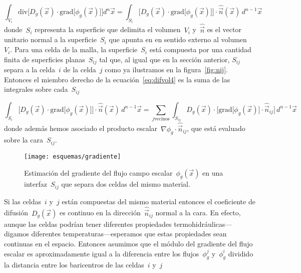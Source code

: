\begin{equation}\label{eq:difvol4}
 \int_{V_i} \text{div} {\Big[ D_g(\vec{x}) \cdot \text{grad} {\big[\phi_g(\vec{x})\big]} \Big]} d^n\vec{x} =
\int_{S_i} \Big[ D_g(\vec{x}) \cdot \text{grad} {\big[\phi_g(\vec{x})\big]} \Big] \cdot \hat{\vec{n}}(\vec{x}) \, d^{n-1} \vec{x}
\end{equation}
%
donde~$S_i$ representa la superficie que delimita el volumen~$V_i$ y~$\hat{\vec{n}}$ es el vector unitario normal a la superficie~$S_i$ que apunta en en sentido externo al volumen~$V_i$. Para una celda de la malla, la superficie~$S_i$ está compuesta por una cantidad finita de superficies planas~$S_{ij}$ tal que, al igual que en la sección anterior, $S_{ij}$ separa a la celda~$i$ de la celda~$j$ como ya ilustramos en la figura~\ref{fig:nij}. Entonces el miembro derecho de la ecuación~\eqref{eq:difvol4} es la suma de las integrales sobre cada~$S_{ij}$

\begin{equation*}
\int_{S_i} \Big[ D_g(\vec{x}) \cdot \text{grad} {\big[\phi_g(\vec{x})\big]} \Big] \cdot \hat{\vec{n}}(\vec{x}) \, d^{n-1} \vec{x} =
\sum_{j \text{vecinos}}
\int_{S_{ij}} D_g(\vec{x}) \cdot \Big[ \text{grad} {\big[\phi_g(\vec{x})\big]}  \cdot \hat{\vec{n}}_{ij} \Big] \, d^{n-1} \vec{x}
\end{equation*}
%
donde además hemos asociado el producto escalar~$\nabla \phi_g \cdot \hat{\vec{n}}_{ij}$, que está evaluado sobre la cara~$S_{ij}$.


\begin{figure}
 \begin{center}
  \texttt{[image: esquemas/gradiente]}
 \end{center}
\caption{\label{fig:gradiente}Estimación del gradiente del flujo campo escalar~$\phi_g(\vec{x})$ en una interfaz~$S_{ij}$ que separa dos celdas del mismo material.}
\end{figure}


\medskip

Si las celdas~$i$ y~$j$ están compuestas del mismo material entonces el coeficiente de difusión~$D_g(\vec{x})$ es continuo en la dirección~$\hat{\vec{n}}_{ij}$ normal a la cara. En efecto, aunque las celdas podrían tener diferentes propiedades termohidráulicas---digamos diferentes tem\-pe\-ra\-tu\-ras---esperamos que estas propiedades sean continuas en el espacio. Entonces asumimos que el módulo del gradiente del flujo escalar es aproximadamente igual a la diferencia entre los flujos~$\phi_g^j$ y~$\phi_g^i$ dividido la distancia entre los baricentros de las celdas~$i$ y~$j$

